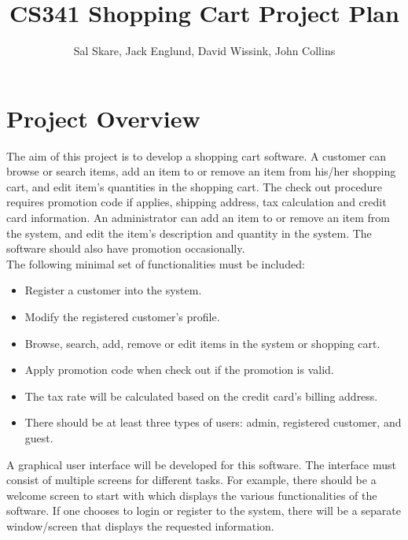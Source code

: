 \documentclass[10pt,letter]{article}
\begin{document}

\title{CS341 Shopping Cart Project Plan}

\author{Sal Skare, Jack Englund, David Wissink, John Collins}

\maketitle 

\section*{Project Overview} The aim of this project is to develop a shopping cart software. A customer can browse or
search items, add an item to or remove an item from his/her shopping cart, and edit item’s
quantities in the shopping cart. The check out procedure requires promotion code if
applies, shipping address, tax calculation and credit card information. An administrator
can add an item to or remove an item from the system, and edit the item’s description and
quantity in the system. The software should also have promotion occasionally.
\\
The following minimal set of functionalities must be included:
\begin{itemize}
    \item Register a customer into the system.
    \item Modify the registered customer’s profile.
    \item Browse, search, add, remove or edit items in the system or shopping cart.
    \item Apply promotion code when check out if the promotion is valid.
    \item The tax rate will be calculated based on the credit card’s billing address.
    \item There should be at least three types of users: admin, registered customer, and guest.
\end{itemize}

\par A graphical user interface will be developed for this software. The interface must consist
of multiple screens for different tasks. For example, there should be a welcome screen to
start with which displays the various functionalities of the software. If one chooses to
login or register to the system, there will be a separate window/screen that displays the
requested information. 
\end{document}
